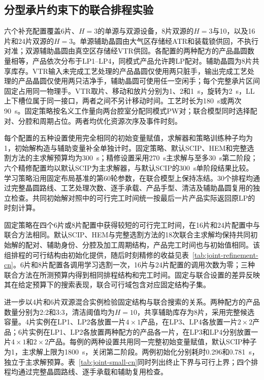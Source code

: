 \documentclass[final,5p,times,twocolumn]{elsarticle}
\begin{document}
\subsection{分型承片约束下的联合排程实验}
\label{sec:joint-evidence-cn}

六个补充配置覆盖6片、$H=3$的单源与双源设备，8片双源的$H=3$与10，以及16片和24片双源的$H=3$。单源辅助晶圆由大气区存储经ATR和装载锁供回，不执行对准；双源辅助晶圆由真空区存储经VTR供回。各配置的两种配方的产品晶圆数量相等，产品依次分布于LP1--LP4，同模式产品允许跨LP配对。辅助晶圆为8片共享库存。VTR输入未完成工艺处理的产品晶圆仅使用两只脏手，输出完成工艺处理的产品晶圆仅使用两只洁净手，辅助晶圆可使用任一空闲手；每个完整承片区间固定占用同一物理手。VTR取片、移动和放片分别为1、2和1~s，旋转为2~s，LL上下槽位属于同一接口，两者之间不另计移动时间。工艺时长为180~s或两次90~s。固定策略按名义工作量向两台腔室分配同模式PW对；联合模型同时选择配对、分腔和周期占位。两者均优化资源次序及事件时刻。

每个配置的五种设置使用完全相同的初始变量赋值，求解器和策略训练种子均为1，初始解构造与辅助变量补全单独计时。固定策略、默认SCIP、HEM和完整选割方法的主求解预算均为300~s；精修设置采用270~s主求解与至多30~s第二阶段；六个精修配置均以默认SCIP为主求解器，与默认SCIP的300~s单阶段结果比较。学习策略沿用固定布局基准的第60轮参数，在联合模型上保持冻结。30个排程均通过完整晶圆路线、工艺处理次数、逐手承载、产品手型、清洁及辅助晶圆复用的独立检查。共同初始解对照中的可行完工时间统一按最后一片产品实际返回原LP的时刻计算。


固定策略在四个6片或8片配置中获得较短的可行完工时间，在16片和24片配置中与联合方法相同。默认SCIP、HEM与完整选割方法的18次联合主求解均保持共同初始解的配对、辅助身份、分腔及加工周期结构，产品完工时间也与初始值相同。该组排程的可行结构由初始化提供，随后时刻精修的收益见表~\ref{tab:joint-refinement-cn}。6片和8片配置各调用学习选割一次，16片与24片配置的调用次数为零；三种联合方法在所测预算内得到相同排程结构和完工时间。固定与联合设置的差异反映其在给定预算下的搜索表现，联合可行域包含对应固定结构子集。

进一步以4片和6片双源混合实例检验固定结构与联合搜索的关系。两种配方的产品数量分别为2:2和3:3，清洁阈值均为$H=10$，共享辅助库存为8片，采用完整候选容量。4片实例在LP1、LP2各放置一片$4\times1$产品，在LP3、LP4各放置一片$2\times2$产品；6片实例在LP1、LP2各放置两种配方的产品各一片，在LP3和LP4分别放置一片$4\times1$和$2\times2$产品。每例的两种设置共用同一完整初始变量赋值，默认SCIP种子为1，主求解上限为1800~s，关闭第二阶段。两例初始化分别耗时0.296和0.781~s，独立于主求解预算。表~\ref{tab:joint-small-cn}同时列出终止下界与可行上界；四个排程均通过完整晶圆路线、逐手承载和辅助复用检查。
\end{document}
